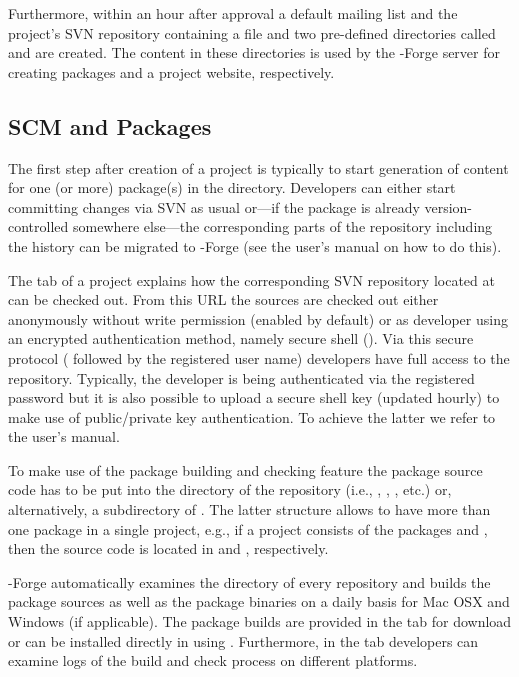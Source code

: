 Furthermore, within an hour after approval a default mailing list and
the project's SVN repository containing a  file and two
pre-defined directories called  and  are created. 
The content in these directories is used by the \R{}-Forge server
for creating \R{} packages and a project website, respectively.


\subsection{SCM and \R{} Packages}

The first step after creation of a project is typically to start
generation of content for one (or more) \R{} package(s) in the 
directory. Developers can either start committing changes via SVN as usual
or---if the package is already version-controlled somewhere else---the
corresponding parts of the repository including the history can be 
migrated to \R{}-Forge (see the user's manual on how to do this).

The  tab of a project explains how the corresponding SVN
repository located at 
can be checked out. From
this URL the sources are checked out either 
anonymously without write permission (enabled by default) or as
developer using an encrypted authentication method, namely secure
shell (). Via this secure protocol (
followed by the registered user name) developers have full access to the
repository. Typically, the developer is being authenticated via the
registered password but it is also possible to upload a secure shell
key (updated hourly) to make use of public/private key
authentication. To achieve the latter we refer to the user's manual.

To make use of the package building and checking feature
the package source code has to be put into the  directory
of the repository (i.e., ,
, , etc.) or, alternatively, a 
subdirectory of . The latter structure allows to
have more than one package in a single project, e.g., if
a project consists of the packages  and , then the
source code is located in  and ,
respectively.

\R{}-Forge automatically examines the  directory of
every repository and builds the package sources as well as the package
binaries on a daily basis for Mac OSX and Windows (if applicable). The
package builds 
are provided in the  tab for download or can be
installed directly in \R{} using 
. Furthermore, in the  tab developers can examine logs of the build and check
process on different platforms. 

